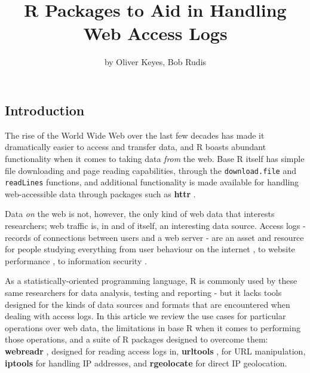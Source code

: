 \title{R Packages to Aid in Handling Web Access Logs}
\author{by Oliver Keyes, Bob Rudis}

\maketitle


\subsection{Introduction}\label{introduction}

The rise of the World Wide Web over the last few decades has made it
dramatically easier to access and transfer data, and R \citep{RCore}
boasts abundant functionality when it comes to taking data \emph{from}
the web. Base R itself has simple file downloading and page reading
capabilities, through the \texttt{download.file} and \texttt{readLines}
functions, and additional functionality is made available for handling
web-accessible data through packages such as \textbf{httr} \citep{httr}.

Data \emph{on} the web is not, however, the only kind of web data that
interests researchers; web traffic is, in and of itself, an interesting
data source. Access logs - records of connections between users and a
web server - are an asset and resource for people studying everything
from user behaviour on the internet \citep{halfak}, to website
performance \citep{performance}, to information security
\citep{infosec}.

As a statistically-oriented programming language, R is commonly used by
these same researchers for data analysis, testing and reporting - but it
lacks tools designed for the kinds of data sources and formats that are
encountered when dealing with access logs. In this article we review the
use cases for particular operations over web data, the limitations in
base R when it comes to performing those operations, and a suite of R
packages designed to overcome them: \textbf{webreadr} \citep{webreadr},
designed for reading access logs in, \textbf{urltools} \citep{urltools},
for URL manipulation, \textbf{iptools} \citep{rgeolocate} for handling
IP addresses, and \textbf{rgeolocate} \citep{rgeolocate} for direct IP
geolocation.

